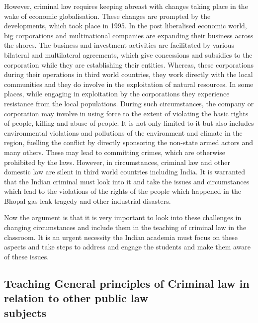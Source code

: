 \begin{multicols}{2}
\noi
However, criminal law requires keeping abreast with changes taking place in the
wake of economic globalisation. These changes are prompted by the developments,
which took place in 1995. In the post liberalised economic world, big corporations
and multinational companies are expanding their business across the shores. The
business and investment activities are facilitated by various bilateral and multilateral
agreements, which give concessions and subsidies to the corporation while they are
establishing their entities. Whereas, these corporations during their operations in third
world countries, they work directly with the local communities and they do involve in
the exploitation of natural resources. In some places, while engaging in exploitation
by the corporations they experience resistance from the local populations. During 
such circumstances, the company or corporation may involve in using force to the
extent of violating the basic rights of people, killing and abuse of people. It is not only
limited to it but also includes environmental violations and pollutions of the
environment and climate in the region, fuelling the conflict by directly sponsoring the
non-state armed actors and many others. These may lead to committing crimes, which
are otherwise prohibited by the laws. However, in circumstances, criminal law and
other domestic law are silent in third world countries including India. It is warranted
that the Indian criminal must look into it and take the issues and circumstances which
lead to the violations of the rights of the people which happened in the Bhopal gas
leak tragedy and other industrial disasters.

\noi
Now the argument is that it is very important to look into these challenges in changing
circumstances and include them in the teaching of criminal law in the classroom. It is
an urgent necessity the Indian academia must focus on these aspects and take steps to
address and engage the students and make them aware of these issues.

\vspace{-.3cm}

\subsection{Teaching General principles of Criminal law in relation to other public law\\ subjects}\label{subsection-2.1}

\vspace{-.2cm}


\end{multicols}
